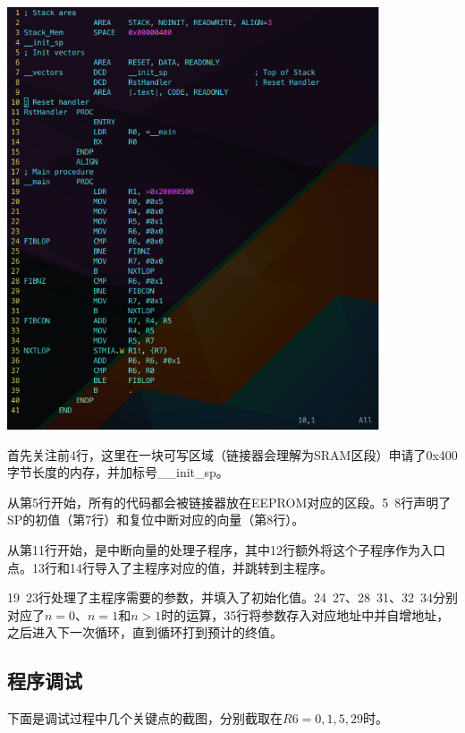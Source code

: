 \documentclass{ctexart}
\begin{document}
\begin{center}\includegraphics[width=11cm]{./img/code.png}\end{center}

首先关注前4行，这里在一块可写区域（链接器会理解为SRAM区段）申请了0x400字节长度的内存，并加标号\_\_init\_sp。

从第5行开始，所有的代码都会被链接器放在EEPROM对应的区段。5~8行声明了SP的初值（第7行）和复位中断对应的向量（第8行）。

从第11行开始，是中断向量的处理子程序，其中12行额外将这个子程序作为入口点。13行和14行导入了主程序对应的值，并跳转到主程序。

19~23行处理了主程序需要的参数，并填入了初始化值。24~27、28~31、32~34分别对应了$n=0$、$n=1$和$n>1$时的运算，35行将参数存入对应地址中并自增地址，之后进入下一次循环，直到循环打到预计的终值。

\subsection{程序调试}

下面是调试过程中几个关键点的截图，分别截取在$R6=0,1,5,29$时。
\end{document}
